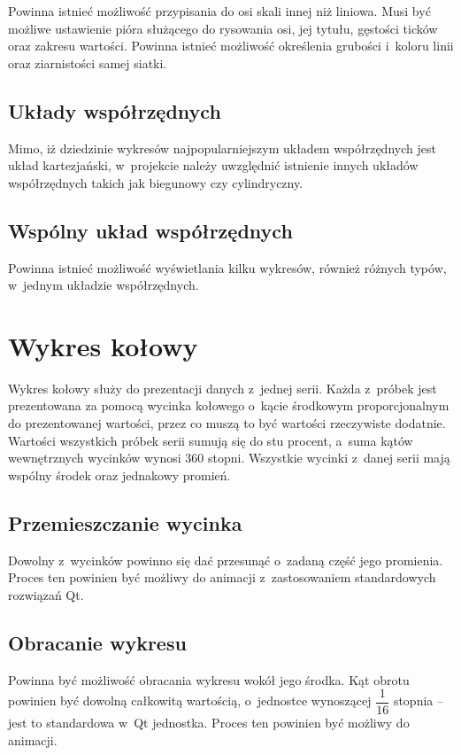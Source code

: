 Powinna istnieć możliwość przypisania do osi skali innej niż liniowa. Musi być możliwe ustawienie pióra służącego do rysowania osi, jej tytułu, gęstości ticków oraz zakresu wartości. Powinna istnieć możliwość określenia grubości i~koloru linii oraz ziarnistości samej siatki.

\subsection{Układy współrzędnych}
Mimo, iż dziedzinie wykresów najpopularniejszym układem współrzędnych jest układ kartezjański, w~projekcie należy uwzględnić istnienie innych układów współrzędnych takich jak biegunowy czy cylindryczny.

\subsection{Wspólny układ współrzędnych}
Powinna istnieć możliwość wyświetlania kilku wykresów, również różnych typów, w~jednym układzie współrzędnych.





\section{Wykres kołowy}
Wykres kołowy służy do prezentacji danych z~jednej serii. Każda z~próbek jest prezentowana za pomocą wycinka kołowego o~kącie środkowym proporcjonalnym do prezentowanej wartości, przez co muszą to być wartości rzeczywiste dodatnie. Wartości wszystkich próbek serii sumują się do stu procent, a~suma kątów wewnętrznych wycinków wynosi 360 stopni. Wszystkie wycinki z~danej serii mają wspólny środek oraz jednakowy promień.

\subsection{Przemieszczanie wycinka}
Dowolny z~wycinków powinno się dać przesunąć o~zadaną część jego promienia. Proces ten powinien być możliwy do animacji z~zastosowaniem standardowych rozwiązań Qt.

\subsection{Obracanie wykresu}
Powinna być możliwość obracania wykresu wokół jego środka. Kąt obrotu powinien być dowolną całkowitą wartością, o~jednostce wynoszącej $\dfrac{1}{16}$ stopnia -- jest to standardowa w~Qt jednostka. Proces ten powinien być możliwy do animacji.
 

